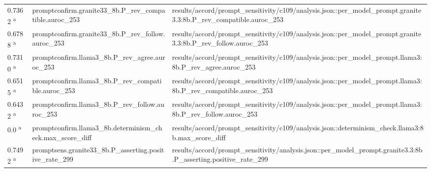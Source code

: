 \begin{longtable}{@{}p{0.7in}p{1.9in}p{2.6in}@{}}
0.7362 \textsuperscript{a} & promptconfirm.\allowbreak{}granite33\_8b.\allowbreak{}P\_rev\_compatible.\allowbreak{}auroc\_253 & results/\allowbreak{}accord/\allowbreak{}prompt\_sensitivity/\allowbreak{}c109/\allowbreak{}analysis.\allowbreak{}json::per\_model\_prompt.\allowbreak{}granite3.\allowbreak{}3:8b.\allowbreak{}P\_rev\_compatible.\allowbreak{}auroc\_253\\
0.6788 \textsuperscript{a} & promptconfirm.\allowbreak{}granite33\_8b.\allowbreak{}P\_rev\_follow.\allowbreak{}auroc\_253 & results/\allowbreak{}accord/\allowbreak{}prompt\_sensitivity/\allowbreak{}c109/\allowbreak{}analysis.\allowbreak{}json::per\_model\_prompt.\allowbreak{}granite3.\allowbreak{}3:8b.\allowbreak{}P\_rev\_follow.\allowbreak{}auroc\_253\\
0.7310 \textsuperscript{a} & promptconfirm.\allowbreak{}llama3\_8b.\allowbreak{}P\_rev\_agree.\allowbreak{}auroc\_253 & results/\allowbreak{}accord/\allowbreak{}prompt\_sensitivity/\allowbreak{}c109/\allowbreak{}analysis.\allowbreak{}json::per\_model\_prompt.\allowbreak{}llama3:8b.\allowbreak{}P\_rev\_agree.\allowbreak{}auroc\_253\\
0.6515 \textsuperscript{a} & promptconfirm.\allowbreak{}llama3\_8b.\allowbreak{}P\_rev\_compatible.\allowbreak{}auroc\_253 & results/\allowbreak{}accord/\allowbreak{}prompt\_sensitivity/\allowbreak{}c109/\allowbreak{}analysis.\allowbreak{}json::per\_model\_prompt.\allowbreak{}llama3:8b.\allowbreak{}P\_rev\_compatible.\allowbreak{}auroc\_253\\
0.6432 \textsuperscript{a} & promptconfirm.\allowbreak{}llama3\_8b.\allowbreak{}P\_rev\_follow.\allowbreak{}auroc\_253 & results/\allowbreak{}accord/\allowbreak{}prompt\_sensitivity/\allowbreak{}c109/\allowbreak{}analysis.\allowbreak{}json::per\_model\_prompt.\allowbreak{}llama3:8b.\allowbreak{}P\_rev\_follow.\allowbreak{}auroc\_253\\
0.0 \textsuperscript{a} & promptconfirm.\allowbreak{}llama3\_8b.\allowbreak{}determinism\_check.\allowbreak{}max\_score\_diff & results/\allowbreak{}accord/\allowbreak{}prompt\_sensitivity/\allowbreak{}c109/\allowbreak{}analysis.\allowbreak{}json::determinism\_check.\allowbreak{}llama3:8b.\allowbreak{}max\_score\_diff\\
0.7492 \textsuperscript{a} & promptsens.\allowbreak{}granite33\_8b.\allowbreak{}P\_asserting.\allowbreak{}positive\_rate\_299 & results/\allowbreak{}accord/\allowbreak{}prompt\_sensitivity/\allowbreak{}analysis.\allowbreak{}json::per\_model\_prompt.\allowbreak{}granite3.\allowbreak{}3:8b.\allowbreak{}P\_asserting.\allowbreak{}positive\_rate\_299\\

\end{longtable}
